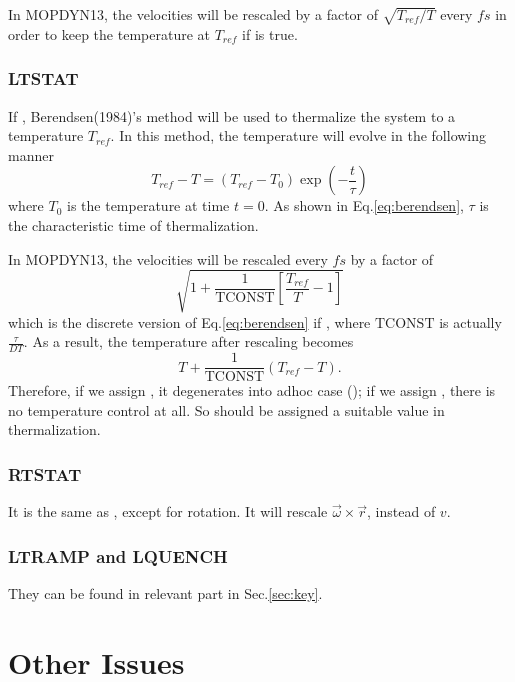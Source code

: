 \documentclass[11pt]{JHEP3}
\begin{document}
In MOPDYN13, the velocities will be rescaled by a factor of
$\sqrt{T_{ref}/T}$ every  $fs$ in order to keep the
temperature at $T_{ref}$ if  is true.

\subsubsection*{LTSTAT}
If , Berendsen(1984)'s method will be used to
thermalize the system to a temperature $T_{ref}$. In this method,
the temperature will evolve in the following manner
\begin{equation}
T_{ref}-T = (T_{ref}-T_0)\exp(-\frac{t}{\tau}) \label{eq:berendsen}
\end{equation}
where $T_0$ is the temperature at time $t=0$. As shown in
Eq.\ref{eq:berendsen}, $\tau$ is the characteristic time of
thermalization.

In MOPDYN13, the velocities will be rescaled every  $fs$
by a factor of
\[\sqrt{1+\frac{1}{\textrm{TCONST}} \left[ \frac{T_{ref}}{T}-1\right]}  \]
which is the discrete version of Eq.\ref{eq:berendsen} if
, where $\textrm{TCONST}$ is actually
$\frac{\tau}{DT}$. As a result, the temperature after rescaling
becomes
\[ T + \frac{1}{\textrm{TCONST}}(T_{ref}-T). \] Therefore, if we assign
, it degenerates into adhoc case ();
if we assign , there is no
temperature control at all. So  should be assigned a
suitable value in thermalization.

\subsubsection*{RTSTAT}
It is the same as , except for rotation. It will
rescale $\vec{\omega}\times\vec{r}$, instead of $v$.

\subsubsection*{LTRAMP and LQUENCH}
They can be found in relevant part in Sec.\ref{sec:key}.


\section{Other Issues}
\end{document}

